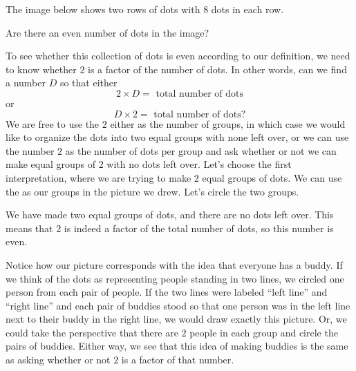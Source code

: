 \documentclass{ximera}
\begin{document}
\begin{question}
The image below shows two rows of dots with $8$ dots in each row.
\begin{image}
\end{image}

Are there an even number of dots in the image?

\begin{explanation}
To see whether this collection of dots is even according to our definition, we need to know whether $2$ is a factor of the number of dots. In other words, can we find a number $D$ so that either
\[
2 \times D = \textrm{ total number of dots}
\]
or
\[
D \times 2 = \textrm{ total number of dots}?
\]
We are free to use the $2$ either as the number of groups, in which case we would like to organize the dots into two equal groups with none left over, or we can use the number $2$ as the number of dots per group and ask whether or not we can make equal groups of $2$ with no dots left over. Let's choose the first interpretation, where we are trying to make $2$ equal groups of dots. We can use the  as our groups in the picture we drew. Let's circle the two groups.
\begin{image}
\end{image}
We have made two equal groups of dots, and there are no dots left over. This means that $2$ is indeed a factor of the total number of dots, so this number is even.
\end{explanation}
\end{question}
Notice how our picture corresponds with the idea that everyone has a buddy. If we think of the dots as representing people standing in two lines, we circled one person from each pair of people. If the two lines were labeled ``left line'' and ``right line'' and each pair of buddies stood so that one person was in the left line next to their buddy in the right line, we would draw exactly this picture. Or, we could take the perspective that there are $2$ people in each group and circle the pairs of buddies. Either way, we see that this idea of making buddies is the same as asking whether or not $2$ is a factor of that number.
\end{document}
